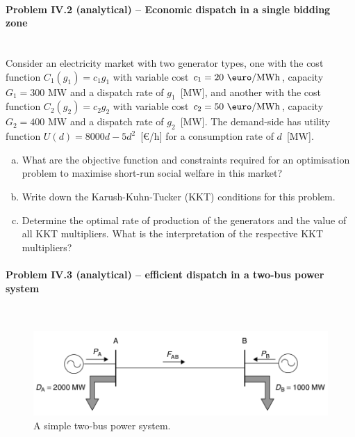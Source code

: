 \documentclass[11pt,a4paper,fleqn]{scrartcl}
\def\mw{\text{ MW}}
\def\emwh{\text{ \euro/MWh}}
\begin{document}
\paragraph{Problem IV.2 (analytical) -- Economic dispatch in a single bidding zone}~\\

Consider an electricity market with two generator types, one with the cost function $C_1(g_1)=c_1g_1$ with variable cost $c_1 = 20\emwh$, capacity $G_1 = 300\mw$ and a dispatch rate of $g_1$~[MW], and another with the cost function $C_2(g_2)=c_2g_2$ with variable cost $c_2=50\emwh$, capacity $G_2=400\mw$ and a dispatch rate of $g_2$~[MW]. The demand-side has utility function $U(d) = 8000d - 5d^2$~[\euro/h] for a consumption rate of $d$~[MW].
\begin{enumerate}[(a)]
 \item What are the objective function and constraints required for an optimisation problem to maximise short-run social welfare in this market?
 \item Write down the Karush-Kuhn-Tucker (KKT) conditions for this problem.
 \item Determine the optimal rate of production of the generators and the value of all KKT multipliers. What is the interpretation of the respective KKT multipliers?
\end{enumerate}

\newpage
\paragraph{Problem IV.3 (analytical) -- efficient dispatch in a two-bus power system}~\\

\begin{figure}[h]
 \centering
 \includegraphics[width=14cm]{two-bus}

 \caption{A simple two-bus power system.}
 \label{twobus}
\end{figure}
\end{document}
